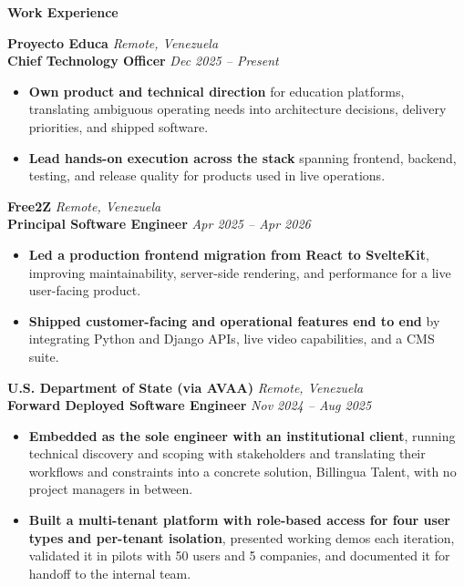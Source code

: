 \documentclass[11pt]{article}
\begin{document}
\vspace{8pt}
\begin{center}
    \textbf{Work Experience}
\end{center}
\vspace{-4pt}

\textbf{Proyecto Educa} \hfill \textit{Remote, Venezuela} \\
\textbf{Chief Technology Officer} \hfill \textit{Dec 2025 -- Present}
\begin{itemize}
    \item \textbf{Own product and technical direction} for education platforms, translating ambiguous operating needs into architecture decisions, delivery priorities, and shipped software.
    \item \textbf{Lead hands-on execution across the stack} spanning frontend, backend, testing, and release quality for products used in live operations.
\end{itemize}

\vspace{10pt}
\textbf{Free2Z} \hfill \textit{Remote, Venezuela} \\
\textbf{Principal Software Engineer} \hfill \textit{Apr 2025 -- Apr 2026}
\begin{itemize}
    \item \textbf{Led a production frontend migration from React to SvelteKit}, improving maintainability, server-side rendering, and performance for a live user-facing product.
    \item \textbf{Shipped customer-facing and operational features end to end} by integrating Python and Django APIs, live video capabilities, and a CMS suite.
\end{itemize}

\vspace{10pt}
\textbf{U.S. Department of State (via AVAA)} \hfill \textit{Remote, Venezuela} \\
\textbf{Forward Deployed Software Engineer} \hfill \textit{Nov 2024 -- Aug 2025}
\begin{itemize}
    \item \textbf{Embedded as the sole engineer with an institutional client}, running technical discovery and scoping with stakeholders and translating their workflows and constraints into a concrete solution, Billingua Talent, with no project managers in between.
    \item \textbf{Built a multi-tenant platform with role-based access for four user types and per-tenant isolation}, presented working demos each iteration, validated it in pilots with 50 users and 5 companies, and documented it for handoff to the internal team.
\end{itemize}
\end{document}

